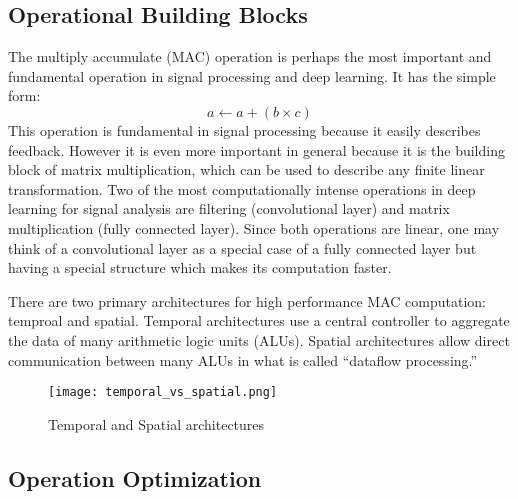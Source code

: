 \subsection{Operational Building Blocks}
The multiply accumulate (MAC) operation is perhaps the most important and fundamental operation in signal processing and deep learning.  It has the simple form:
$$ a \leftarrow a + (b\times c) $$
This operation is fundamental in signal processing because it easily describes feedback.  However it is even more important in general because it is the building block of matrix multiplication, which can be used to describe any finite linear transformation.  Two of the most computationally intense operations in deep learning for signal analysis are filtering (convolutional layer) and matrix multiplication (fully connected layer).  Since both operations are linear, one may think of a convolutional layer as a special case of a fully connected layer but having a special structure which makes its computation faster.

There are two primary architectures for high performance MAC computation: temproal and spatial. Temporal architectures use a central controller to aggregate the data of many arithmetic logic units (ALUs).  Spatial architectures allow direct communication between many ALUs in what is called ``dataflow processing.'' ~\cite{DBLP:journals/corr/SzeCYE17} 

\begin{figure}[H]
  \centering
  \texttt{[image: temporal\_vs\_spatial.png]}
  \caption{Temporal and Spatial architectures  ~\cite{DBLP:journals/corr/SzeCYE17}}
\end{figure} 

\subsection{Operation Optimization}
